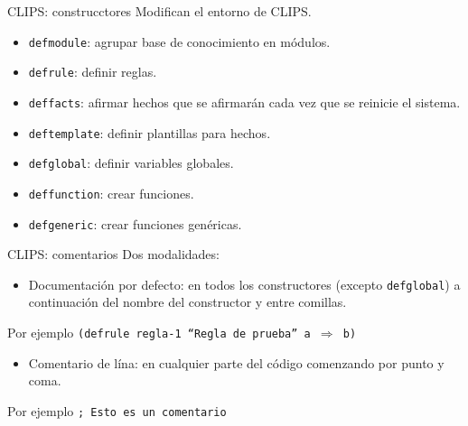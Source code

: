 \documentclass[usenames,dvipsnames,aspectratio=169]{beamer}
\begin{document}
\begin{frame}{CLIPS: construcctores}
	Modifican el entorno de CLIPS.
	\begin{itemize}
		\item \texttt{defmodule}: agrupar base de conocimiento en módulos.
		\item \texttt{defrule}: definir reglas.
		\item \texttt{deffacts}: afirmar hechos que se afirmarán cada vez que se reinicie el sistema.
		\item \texttt{deftemplate}: definir plantillas para hechos.
		\item \texttt{defglobal}: definir variables globales.
		\item \texttt{deffunction}: crear funciones.
		\item \texttt{defgeneric}: crear funciones genéricas.
	\end{itemize}
\end{frame}

\begin{frame}{CLIPS: comentarios}
	Dos modalidades:
	\begin{itemize}
		\item Documentación por defecto: en todos los constructores (excepto \texttt{defglobal}) a continuación del nombre del constructor y entre comillas.
	\end{itemize}
	\begin{exampleblock}{Por ejemplo}
		\texttt{(defrule regla-1 ``Regla de prueba'' a $\Rightarrow$ b)}
	\end{exampleblock}
	\begin{itemize}
		\item Comentario de lína: en cualquier parte del código comenzando por punto y coma.
	\end{itemize}
	\begin{exampleblock}{Por ejemplo}
		\texttt{; Esto es un comentario}
	\end{exampleblock}
\end{frame}

\begin{frame}
\titlepage
\end{frame}
\end{document}
